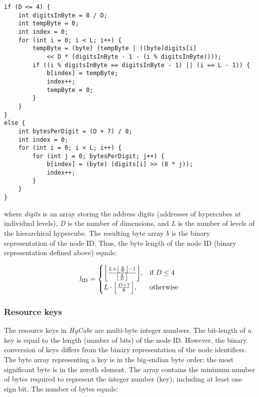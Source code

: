 \begin{lstlisting}[style=listing1noindentsmall]
if (D <= 4) {
    int digitsInByte = 8 / D;
    int tempByte = 0;
    int index = 0;
    for (int i = 0; i < L; i++) {
        tempByte = (byte) (tempByte | ((byte)digits[i] 
            << D * (digitsInByte - 1 - (i % digitsInByte))));
        if ((i % digitsInByte == digitsInByte - 1) || (i == L - 1)) {
            b[index] = tempByte;
            index++;
            tempByte = 0;
        }
    }
}
else {
    int bytesPerDigit = (D + 7) / 8;
    int index = 0;
    for (int i = 0; i < L; i++) {
        for (int j = 0; bytesPerDigit; j++) {
            b[index] = (byte) (digits[i] >> (8 * j));
            index++;
        }
    }
}
\end{lstlisting}

\noindent
where \emph{digits} is an array storing the address digits (addresses of hypercubes at individual levels), \emph{D} is the number of dimensions, and \emph{L} is the number of levels of the hierarchical hypercube. The resulting byte array \emph{b} is the binary representation of the node ID. Thus, the byte length of the node ID (binary representation defined above) equals:


$$
	l_{\text{ID}} = \begin{cases}
		\biggl\lfloor\frac{L + \left\lfloor\frac{8}{D}\right\rfloor - 1}{\left\lfloor\frac{8}{D}\right\rfloor}\biggr\rfloor, 		& \text{if}\ D \leq 4\\
		L \cdot  \Bigl\lfloor\frac{D + 7}{8}\Bigr\rfloor, 																			& \text{otherwise}
	\end{cases}
$$



\subsubsection{Resource keys}

The resource keys in \emph{HyCube} are multi-byte integer numbers. The bit-length of a key is equal to the length (number of bits) of the node ID. However, the binary conversion of keys differs from the binary representation of the node identifiers. The byte array representing a key is in the big-endian byte order: the most significant byte is in the zeroth element. The array contains the minimum number of bytes required to represent the integer number (key), including at least one sign bit. The number of bytes equals:

